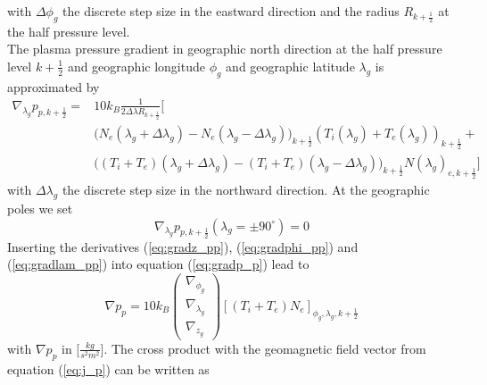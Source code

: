 %
with $\Delta \phi_g$ the discrete step size in the eastward direction and the radius 
$ R_{k+\frac{1}{2}}$ at the half pressure level. \\
%
The plasma pressure gradient in geographic north direction at the half pressure 
level $k+\frac{1}{2}$ and geographic longitude $\phi_g$ and geographic latitude
$\lambda_g$ is approximated by
%
\begin{equation}
  \begin{split}
     \nabla_{\lambda_g} p_{p,k+\frac{1}{2}}  =  & 10 k_B 
        \frac{1}{2 \Delta \lambda R_{k+\frac{1}{2}}}
      \biggl[ \\
      & \bigl( N_e(\lambda_g + \Delta \lambda_g ) - N_e(\lambda_g -\Delta \lambda_g) \bigr)_{k+\frac{1}{2}} 
      (T_i(\lambda_g )+T_e(\lambda_g ))_{k+\frac{1}{2}}  + \\
      & \bigl((T_i+T_e)(\lambda_g + \Delta \lambda_g )- (T_i+T_e)(\lambda_g -\Delta \lambda_g) \bigr)_{k+\frac{1}{2}} 
      N(\lambda_g )_{e, k+\frac{1}{2}} \biggr]
  \end{split}
  \label{eq:gradlam_pp}
\end{equation}
%
with $\Delta \lambda_g$ the discrete step size in the northward direction. At the
geographic poles we set 
%
\begin{equation}
   \nabla_{\lambda_g} p_{p,k+\frac{1}{2}} (\lambda_g= \pm 90^{\circ}) =  0
\end{equation}
%
Inserting the derivatives (\ref{eq:gradz_pp}), (\ref{eq:gradphi_pp}) and
(\ref{eq:gradlam_pp}) into equation (\ref{eq:gradp_p}) lead to
%
\begin{equation}
   \nabla p_p  =  10 k_B \begin{pmatrix} \nabla_{\phi_g} \\
                                           \nabla_{\lambda_g}\\
                                           \nabla_{z_g}
			   \end{pmatrix}
	[(T_i + T_e ) N_e]_{\phi_g, \lambda_g, k+\frac{1}{2}} \label{eq:discgradp_p}
\end{equation}
%
with $\nabla p_p$ in [$\frac{kg}{s^2 m^2}$]. The cross product with the geomagnetic
field vector from equation (\ref{eq:j_p}) can be written as
%
